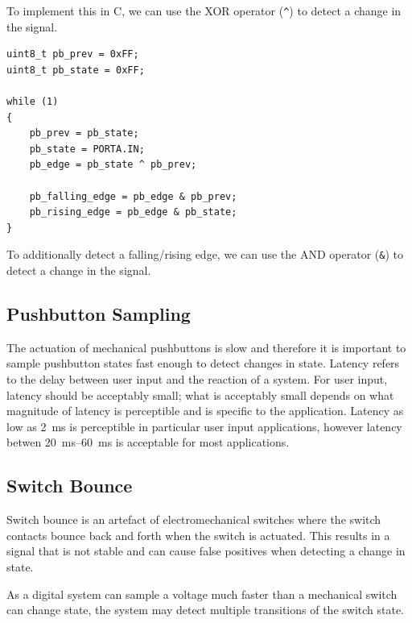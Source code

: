 \documentclass{report}
\begin{document}
To implement this in C, we can use the XOR operator (\texttt{^}) to detect a change in the signal.
\begin{verbatim}
uint8_t pb_prev = 0xFF;
uint8_t pb_state = 0xFF;

while (1)
{
    pb_prev = pb_state;
    pb_state = PORTA.IN;
    pb_edge = pb_state ^ pb_prev;

    pb_falling_edge = pb_edge & pb_prev;
    pb_rising_edge = pb_edge & pb_state;
}
\end{verbatim}
To additionally detect a falling/rising edge, we can use the AND operator (\texttt{&}) to detect a change in the signal.
\subsection{Pushbutton Sampling}
The actuation of mechanical pushbuttons is slow and therefore it is important to sample pushbutton states fast enough to detect changes in state.
Latency refers to the delay between user input and the reaction of a system. For user input, latency should be acceptably small;
what is acceptably small depends on what magnitude of latency is perceptible and is specific to the application.
Latency as low as \qty{2}{ms} is perceptible in particular user input applications, however latency betwen \qtyrange{20}{60}{ms} is acceptable for most applications.
\subsection{Switch Bounce}
Switch bounce is an artefact of electromechanical switches where the switch contacts bounce back and forth when the switch is actuated.
This results in a signal that is not stable and can cause false positives when detecting a change in state.

As a digital system can sample a voltage much faster than a mechanical switch can change state, the system may detect multiple
transitions of the switch state.
\end{document}
